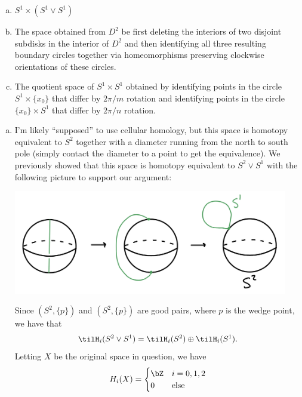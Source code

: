 \begin{homework}[e]
\begin{enumerate}[(a)]
    \item $S^1\times (S^1\vee S^1)$
    \item The space obtained from $D^2$ be first deleting the interiors of two disjoint subdisks in the interior of $D^2$ and then identifying all three resulting boundary circles together via homeomorphisms preserving clockwise orientations of these circles.
    \item The quotient space of $S^1\times S^1$ obtained by identifying points in the circle $S^1\times \{x_0\}$ that differ by $2\pi/m$ rotation and identifying points in the circle $\{x_0\}\times S^1$ that differ by $2\pi/n$ rotation.
  \end{enumerate}
  \begin{prf}
    \begin{enumerate}[(a)]
      \item I'm likely ``supposed'' to use cellular homology, but this space is homotopy equivalent to $S^2$ together with a diameter running from the north to south pole (simply contact the diameter to a point to get the equivalence). We previously showed that this space is homotopy equivalent to $S^2 \vee S^1$ with the following picture to support our argument:
    \begin{center}
      \includegraphics[width=12cm]{figures/hwk5-fig5.jpg}
      \label{fig:prob9-1}
    \end{center}
    Since $(S^2,\{p\})$ and $(S^2,\{p\})$ are good pairs, where $p$ is the wedge point, we have that
    \begin{align*}
      \tilH_i(S^2\vee S^1) = \tilH_i(S^2) \oplus \tilH_i(S^1).
    \end{align*}
    Letting $X$ be the original space in question, we have
    \begin{align*}
      H_i(X) =
      \begin{cases}
        \bZ & i = 0,1,2 \\
        0 & \text{else}

\end{cases}
\end{align*}
\end{enumerate}
\end{prf}
\end{homework}
